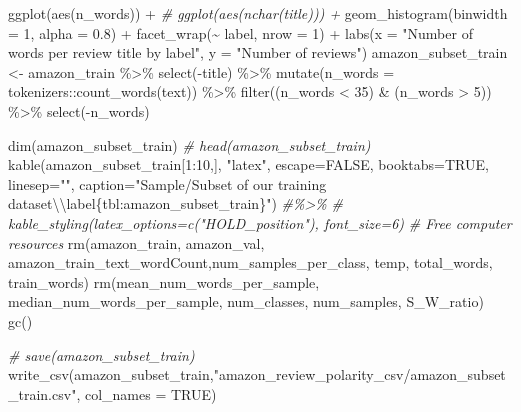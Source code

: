 \documentclass[
]{article}
\newenvironment{Shaded}{}{}
\newcommand{\AttributeTok}[1]{\textcolor[rgb]{0.49,0.56,0.16}{#1}}
\newcommand{\CommentTok}[1]{\textcolor[rgb]{0.38,0.63,0.69}{\textit{#1}}}
\newcommand{\ConstantTok}[1]{\textcolor[rgb]{0.53,0.00,0.00}{#1}}
\newcommand{\DecValTok}[1]{\textcolor[rgb]{0.25,0.63,0.44}{#1}}
\newcommand{\FloatTok}[1]{\textcolor[rgb]{0.25,0.63,0.44}{#1}}
\newcommand{\FunctionTok}[1]{\textcolor[rgb]{0.02,0.16,0.49}{#1}}
\newcommand{\NormalTok}[1]{#1}
\newcommand{\OtherTok}[1]{\textcolor[rgb]{0.00,0.44,0.13}{#1}}
\newcommand{\SpecialCharTok}[1]{\textcolor[rgb]{0.25,0.44,0.63}{#1}}
\newcommand{\StringTok}[1]{\textcolor[rgb]{0.25,0.44,0.63}{#1}}
\begin{document}
\begin{Shaded}
\begin{Highlighting}[]
  \FunctionTok{ggplot}\NormalTok{(}\FunctionTok{aes}\NormalTok{(n\_words)) }\SpecialCharTok{+}
  \CommentTok{\# ggplot(aes(nchar(title))) +}
  \FunctionTok{geom\_histogram}\NormalTok{(}\AttributeTok{binwidth =} \DecValTok{1}\NormalTok{, }\AttributeTok{alpha =} \FloatTok{0.8}\NormalTok{) }\SpecialCharTok{+}
  \FunctionTok{facet\_wrap}\NormalTok{(}\SpecialCharTok{\textasciitilde{}}\NormalTok{ label, }\AttributeTok{nrow =} \DecValTok{1}\NormalTok{) }\SpecialCharTok{+}
  \FunctionTok{labs}\NormalTok{(}\AttributeTok{x =} \StringTok{"Number of words per review title by label"}\NormalTok{,}
       \AttributeTok{y =} \StringTok{"Number of reviews"}\NormalTok{)}
\NormalTok{amazon\_subset\_train }\OtherTok{\textless{}{-}}\NormalTok{ amazon\_train }\SpecialCharTok{\%\textgreater{}\%} \FunctionTok{select}\NormalTok{(}\SpecialCharTok{{-}}\NormalTok{title) }\SpecialCharTok{\%\textgreater{}\%}
  \FunctionTok{mutate}\NormalTok{(}\AttributeTok{n\_words =}\NormalTok{ tokenizers}\SpecialCharTok{::}\FunctionTok{count\_words}\NormalTok{(text)) }\SpecialCharTok{\%\textgreater{}\%}
  \FunctionTok{filter}\NormalTok{((n\_words }\SpecialCharTok{\textless{}} \DecValTok{35}\NormalTok{) }\SpecialCharTok{\&}\NormalTok{ (n\_words }\SpecialCharTok{\textgreater{}} \DecValTok{5}\NormalTok{)) }\SpecialCharTok{\%\textgreater{}\%} \FunctionTok{select}\NormalTok{(}\SpecialCharTok{{-}}\NormalTok{n\_words) }

\FunctionTok{dim}\NormalTok{(amazon\_subset\_train)}
\CommentTok{\# head(amazon\_subset\_train)}
\FunctionTok{kable}\NormalTok{(amazon\_subset\_train[}\DecValTok{1}\SpecialCharTok{:}\DecValTok{10}\NormalTok{,], }\StringTok{"latex"}\NormalTok{, }\AttributeTok{escape=}\ConstantTok{FALSE}\NormalTok{, }\AttributeTok{booktabs=}\ConstantTok{TRUE}\NormalTok{, }\AttributeTok{linesep=}\StringTok{""}\NormalTok{, }\AttributeTok{caption=}\StringTok{"Sample/Subset of our training dataset}\SpecialCharTok{\textbackslash{}\textbackslash{}}\StringTok{label\{tbl:amazon\_subset\_train\}"}\NormalTok{) }\CommentTok{\#\%\textgreater{}\%}
    \CommentTok{\# kable\_styling(latex\_options=c("HOLD\_position"), font\_size=6)}
\CommentTok{\# Free computer resources}
\FunctionTok{rm}\NormalTok{(amazon\_train, amazon\_val, amazon\_train\_text\_wordCount,num\_samples\_per\_class, temp, total\_words, train\_words)}
\FunctionTok{rm}\NormalTok{(mean\_num\_words\_per\_sample, median\_num\_words\_per\_sample, num\_classes, num\_samples, S\_W\_ratio)}
\FunctionTok{gc}\NormalTok{()}

\CommentTok{\# save(amazon\_subset\_train)}
\FunctionTok{write\_csv}\NormalTok{(amazon\_subset\_train,}\StringTok{"amazon\_review\_polarity\_csv/amazon\_subset\_train.csv"}\NormalTok{, }\AttributeTok{col\_names =} \ConstantTok{TRUE}\NormalTok{)}


\end{Highlighting}
\end{Shaded}
\end{document}
